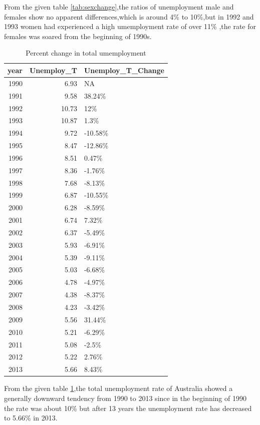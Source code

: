 \documentclass[11pt,a4paper,]{article}
\begin{document}
From the given table \ref{tab:sexchange},the ratios of unemployment male and females show no apparent differences,which is around 4\% to 10\%,but in 1992 and 1993 women had experienced a high umemployment rate of over 11\% ,the rate for females was soared from the beginning of 1990s.

\begin{table}[H]

\caption{\label{tab:Tchange}Percent change in total umemployment}
\centering
\begin{tabular}[t]{r|r|l}
\hline
year & Unemploy\_T & Unemploy\_T\_Change\\
\hline
1990 & 6.93 & NA\\
\hline
1991 & 9.58 & 38.24\%\\
\hline
1992 & 10.73 & 12\%\\
\hline
1993 & 10.87 & 1.3\%\\
\hline
1994 & 9.72 & -10.58\%\\
\hline
1995 & 8.47 & -12.86\%\\
\hline
1996 & 8.51 & 0.47\%\\
\hline
1997 & 8.36 & -1.76\%\\
\hline
1998 & 7.68 & -8.13\%\\
\hline
1999 & 6.87 & -10.55\%\\
\hline
2000 & 6.28 & -8.59\%\\
\hline
2001 & 6.74 & 7.32\%\\
\hline
2002 & 6.37 & -5.49\%\\
\hline
2003 & 5.93 & -6.91\%\\
\hline
2004 & 5.39 & -9.11\%\\
\hline
2005 & 5.03 & -6.68\%\\
\hline
2006 & 4.78 & -4.97\%\\
\hline
2007 & 4.38 & -8.37\%\\
\hline
2008 & 4.23 & -3.42\%\\
\hline
2009 & 5.56 & 31.44\%\\
\hline
2010 & 5.21 & -6.29\%\\
\hline
2011 & 5.08 & -2.5\%\\
\hline
2012 & 5.22 & 2.76\%\\
\hline
2013 & 5.66 & 8.43\%\\
\hline
\end{tabular}
\end{table}

From the given table \ref{tab:Tchange},the total unemployment rate of Australia showed a generally downward tendency from 1990 to 2013 since in the beginning of 1990 the rate was about 10\% but after 13 years the unemployment rate has decreased to 5.66\% in 2013.
\end{document}

